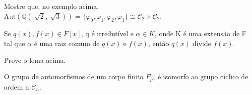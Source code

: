 \documentclass[../algebraIII_notes.tex]{subfiles}
\begin{document}
\begin{exr}
	Mostre que, no exemplo acima, \(\mathrm{Aut}(\mathbb{Q}(\sqrt[]{2}, \sqrt[]{3})) = \{\varphi_{0}, \varphi_1, \varphi_2, \varphi_3\}\cong \mathcal{C}_2 \times \mathcal{C}_2\).
\end{exr}
\begin{lemma*}
	Se \(q(x), f(x)\in F[x]\), q é irredutível e \(\alpha \in K\), onde K é uma extensão de F tal que \(\alpha \) é uma raiz comum de \(q(x)\) e \(f(x)\), então \(q(x)\) divide \(f(x).\)
\end{lemma*}
\begin{exr}
	Prove o lema acima.
\end{exr}
\begin{theorem*}
	O grupo de automorfismos de um corpo finito \(F_{p^{n}}\) é isomorfo ao grupo cíclico de ordem n \(\mathcal{C}_{n}\).
\end{theorem*}
\end{document}
